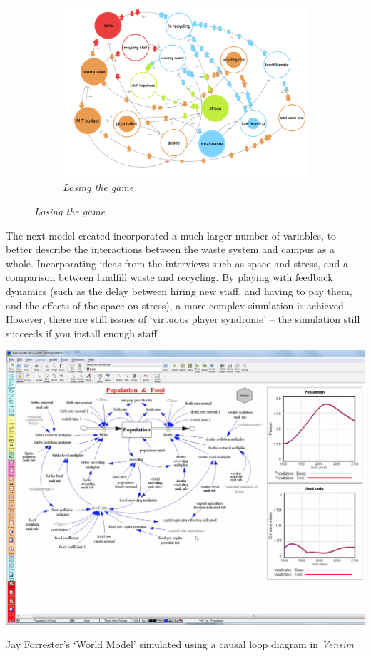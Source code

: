 \documentclass[nofonts,nols,justified,nobib]{tufte-book}
\begin{document}
\begin{figure}
\begin{subfigure}{.3\textwidth}
  \centering
  \includegraphics[width=1\linewidth]{img/3/loopy/big-lose.png}
  \caption{\textit{Losing the game}}
  \label{small:lose}
\end{subfigure}%
\end{figure}
\vspace{0.8cm}

The next model created incorporated a much larger number of variables, to better describe the interactions between the waste system and campus as a whole. Incorporating ideas from the interviews such as space and stress, and a comparison between landfill waste and recycling. By playing with feedback dynamics (such as the delay between hiring new staff, and having to pay them, and the effects of the space on stress), a more complex simulation is achieved. However, there are still issues of `virtuous player syndrome' -- the simulation still succeeds if you install enough staff.

\begin{marginfigure}
  \includegraphics[width=1\linewidth]{img/3/vensim.png}
  \caption{Jay Forrester's `World Model' simulated using a causal loop diagram in \emph{Vensim} \cite{noauthor_vensim_nodate}}
\end{marginfigure}
\end{document}
